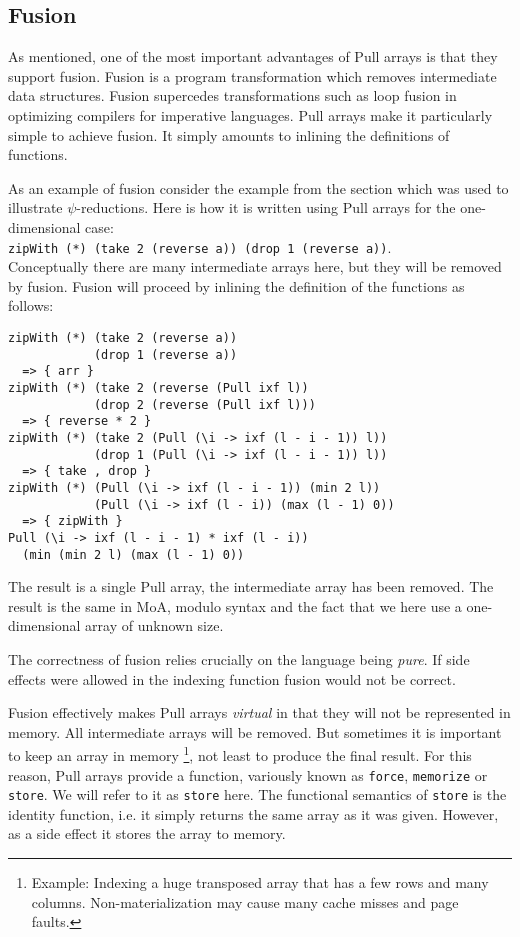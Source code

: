 \documentclass[preprint]{sigplanconf}
\begin{document}
\subsection{Fusion}

As mentioned, one of the most important advantages of Pull arrays is
that they support
fusion\cite{gill1993short,axelsson2010feldspar,keller2010regular}. Fusion
is a program transformation which removes intermediate data structures.
Fusion supercedes transformations such
as loop fusion in optimizing compilers for imperative languages.  Pull
arrays make it particularly simple to achieve fusion. It simply
amounts to inlining the definitions of functions.

As an example of fusion consider the example from the section which
was used to illustrate $\psi$-reductions. Here is how it is written
using Pull arrays for the one-dimensional case:\\
{\small
\verb!zipWith (*) (take 2 (reverse a)) (drop 1 (reverse a))!}.\\
Conceptually there are many intermediate arrays here, but they will be
removed by fusion. Fusion will proceed by inlining the definition
of the functions as follows:

\begin{small}
\begin{Verbatim}
zipWith (*) (take 2 (reverse a))
            (drop 1 (reverse a))
  => { arr }
zipWith (*) (take 2 (reverse (Pull ixf l))
            (drop 2 (reverse (Pull ixf l)))
  => { reverse * 2 }
zipWith (*) (take 2 (Pull (\i -> ixf (l - i - 1)) l))
            (drop 1 (Pull (\i -> ixf (l - i - 1)) l))
  => { take , drop }
zipWith (*) (Pull (\i -> ixf (l - i - 1)) (min 2 l))
            (Pull (\i -> ixf (l - i)) (max (l - 1) 0))
  => { zipWith }
Pull (\i -> ixf (l - i - 1) * ixf (l - i))
  (min (min 2 l) (max (l - 1) 0))
\end{Verbatim}
\end{small}

The result is a single Pull array, the intermediate array has been
removed. The result is the same in MoA, modulo syntax and the fact
that we here use a one-dimensional array of unknown size.

The correctness of fusion relies crucially on the language being
\emph{pure}. If side effects were allowed in the indexing function
fusion would not be correct.

Fusion effectively makes Pull arrays \emph{virtual} in that they will
not be represented in memory. All intermediate arrays will be
removed. But sometimes it is important to keep an array in memory
\footnote{Example: Indexing a huge transposed array that has a few rows and many columns. Non-materialization
may cause many cache misses and page faults.}, 
not least to produce the final result. For this reason, Pull arrays
provide a function, variously known as \verb!force!, \verb!memorize!
  or \verb!store!. We will refer to it as \verb!store! here. The
  functional semantics of \verb!store! is the identity function,
  i.e. it simply returns the same array as it was given. However, as a
  side effect it stores the array to memory.
\end{document}
